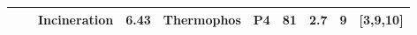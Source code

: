 \documentclass[]{elsarticle}
\begin{document}
\begin{table}
{\begin{threeparttable}
\begin{tabular}{@{}cccccccccc@{}}
				&                                                                                                                                                         & Incineration                                                                     & 6.43                                      & Thermophos                                                                               & P4                                                                                & 81                                                                                    & 2.7                                  & 9                                                            &     [3,9,10]     \\ 
				\bottomrule
			\end{tabular}

\end{threeparttable}}
\end{table}
\end{document}
